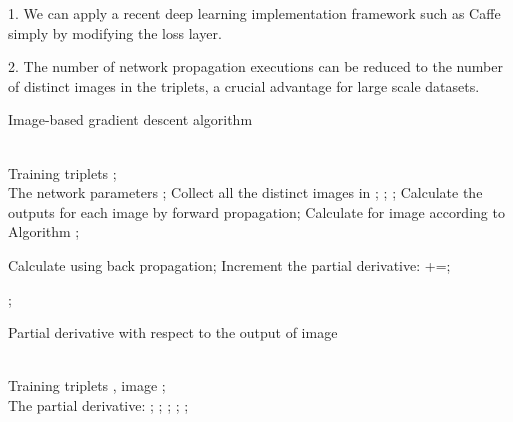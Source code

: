 \documentclass[review]{elsarticle}
\begin{document}
1. We can apply a recent deep learning implementation framework such as Caffe \cite{Jia13caffe} simply by modifying the loss layer.

2. The number of network propagation executions can be reduced to the number of distinct images in the triplets, a crucial advantage for large scale datasets.
\begin{small}
\begin{algorithm}[htb]        
\caption{ Image-based gradient descent algorithm }            
\label{alg:gradDescentByImage}                
\begin{algorithmic}[1]               
\REQUIRE ~~\\                         
   Training triplets ;
\ENSURE ~~\\                          
	The network parameters ;
\STATE Collect all the distinct images  in ;
\WHILE    {}
\STATE ;
\STATE ;
\STATE Calculate the outputs for each image  by forward propagation;
   \FORALL {} 
   	\STATE Calculate   for image  according to Algorithm ;

\STATE Calculate  using back propagation;
\STATE Increment the partial derivative: +=;

   \ENDFOR
\STATE ;
\ENDWHILE          
\end{algorithmic}
\end{algorithm}
\end{small}

\begin{small}
\begin{algorithm}[htb]        
\caption{ Partial derivative with respect to the output of image }            
\label{alg:partialDerivative}                
\begin{algorithmic}[1]               
\REQUIRE ~~\\                         
   Training triplets , image ;
\ENSURE ~~\\                          
	The partial derivative: ;
\STATE ;
   \FORALL {} 
	\IF {}
        \IF {=}
            \STATE ;
        \ELSIF {=}
           \STATE ;
        \ELSIF {=}
           \STATE ;
        \ENDIF
	\ENDIF
   \ENDFOR
\end{algorithmic}
\end{algorithm}
\end{small}
\end{document}
